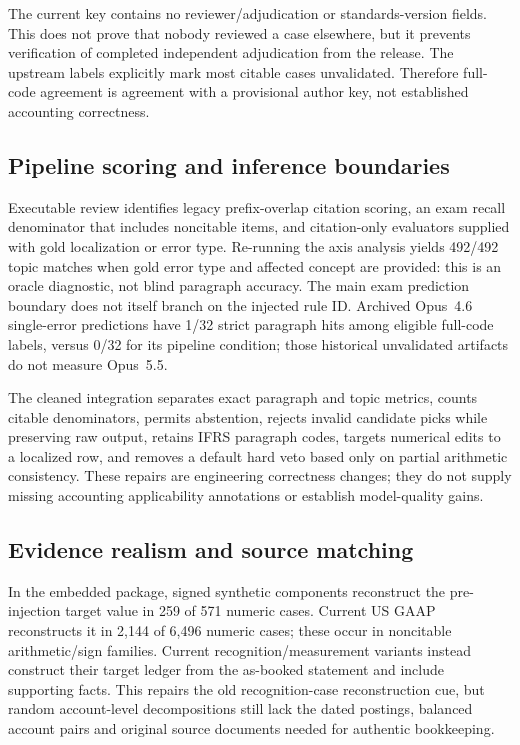 \documentclass[11pt]{article}
\begin{document}
The current key contains no reviewer/adjudication or standards-version fields. This does not prove that nobody reviewed a case elsewhere, but it prevents verification of completed independent adjudication from the release. The upstream labels explicitly mark most citable cases unvalidated. Therefore full-code agreement is agreement with a provisional author key, not established accounting correctness.

\subsection{Pipeline scoring and inference boundaries}
Executable review identifies legacy prefix-overlap citation scoring, an exam recall denominator that includes noncitable items, and citation-only evaluators supplied with gold localization or error type. Re-running the axis analysis yields 492/492 topic matches when gold error type and affected concept are provided: this is an oracle diagnostic, not blind paragraph accuracy. The main exam prediction boundary does not itself branch on the injected rule ID. Archived Opus~4.6 single-error predictions have 1/32 strict paragraph hits among eligible full-code labels, versus 0/32 for its pipeline condition; those historical unvalidated artifacts do not measure Opus~5.5.

The cleaned integration separates exact paragraph and topic metrics, counts citable denominators, permits abstention, rejects invalid candidate picks while preserving raw output, retains IFRS paragraph codes, targets numerical edits to a localized row, and removes a default hard veto based only on partial arithmetic consistency. These repairs are engineering correctness changes; they do not supply missing accounting applicability annotations or establish model-quality gains.

\subsection{Evidence realism and source matching}
In the embedded package, signed synthetic components reconstruct the pre-injection target value in 259 of 571 numeric cases. Current US GAAP reconstructs it in 2,144 of 6,496 numeric cases; these occur in noncitable arithmetic/sign families. Current recognition/measurement variants instead construct their target ledger from the as-booked statement and include supporting facts. This repairs the old recognition-case reconstruction cue, but random account-level decompositions still lack the dated postings, balanced account pairs and original source documents needed for authentic bookkeeping.
\end{document}
